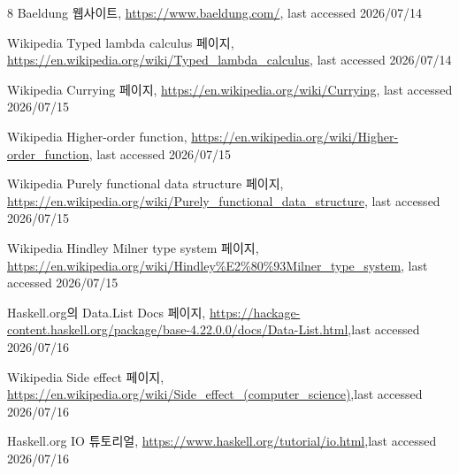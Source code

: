 \documentclass[runningheads]{llncs}
\begin{document}
\begin{thebibliography}{8}
Baeldung 웹사이트, \url{https://www.baeldung.com/}, last accessed 2026/07/14

Wikipedia Typed lambda calculus 페이지, \url{https://en.wikipedia.org/wiki/Typed_lambda_calculus}, last accessed 2026/07/14

Wikipedia Currying 페이지, \url{https://en.wikipedia.org/wiki/Currying}, last accessed 2026/07/15

Wikipedia Higher-order function, \url{https://en.wikipedia.org/wiki/Higher-order_function}, last accessed 2026/07/15

Wikipedia Purely functional data structure 페이지, \url{https://en.wikipedia.org/wiki/Purely_functional_data_structure}, last accessed 2026/07/15

Wikipedia Hindley Milner type system 페이지, \url{https://en.wikipedia.org/wiki/Hindley%E2%80%93Milner_type_system}, last accessed 2026/07/15

Haskell.org의 Data.List Docs 페이지, \url{https://hackage-content.haskell.org/package/base-4.22.0.0/docs/Data-List.html},last accessed 2026/07/16

Wikipedia Side effect 페이지, \url{https://en.wikipedia.org/wiki/Side_effect_(computer_science)},last accessed 2026/07/16

Haskell.org IO 튜토리얼, \url{https://www.haskell.org/tutorial/io.html},last accessed 2026/07/16

\end{thebibliography}
\end{document}
